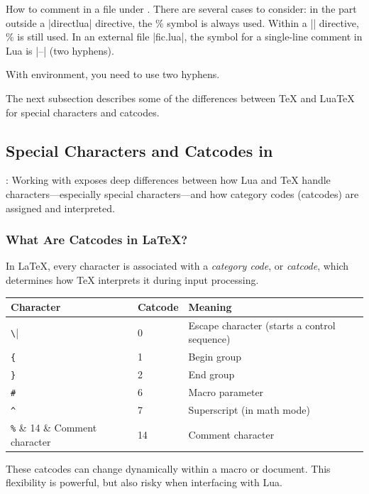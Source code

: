 \tkzRHand How to comment in a file under \tkzEngine{\LUALATEX}. There are several cases to consider: in the \LATEX{} part outside a |directlua| directive, the \% symbol is always used. Within a |\directlua| directive, \% is still used. In an external file |fic.lua|, the symbol for a single-line comment in Lua is |--| (two hyphens).

With  environment, you need to use two hyphens.

The next subsection describes some of the differences between \TeX{} and LuaTeX{} for special characters and catcodes.

\subsection{Special Characters and Catcodes in } %
\label{sub:special_characters_and_catcodes}

\tkzHand{\textcolor{red}{Warning}}:
Working with  exposes deep differences between how Lua and \TeX{} handle characters—especially special characters—and how category codes (catcodes) are assigned and interpreted.

\subsubsection{What Are Catcodes in \LaTeX?} %
\label{ssub:what_are_catcodes}

In \LaTeX{}, every character is associated with a \emph{category code}, or \emph{catcode}, which determines how \TeX{} interprets it during input processing.


\begin{tabular}{lll}
\toprule
 \textbf{Character} & \textbf{Catcode} & \textbf{Meaning} \\
 \midrule
 \verb|\| & 0 & Escape character (starts a control sequence) \\
\verb|{| & 1 & Begin group \\
\verb|}| & 2 & End group \\
\verb|#| & 6 & Macro parameter \\
\verb|^| & 7 & Superscript (in math mode) \\
\verb|%| & 14 & Comment character \\
 \bottomrule
 \end{tabular}


These catcodes can change dynamically within a macro or document. This flexibility is powerful, but also risky when interfacing with Lua.

